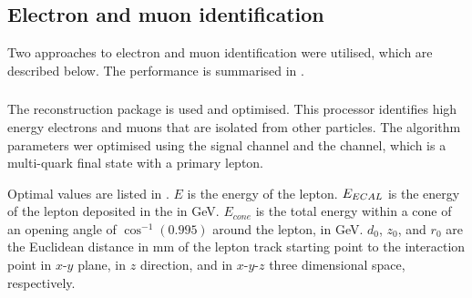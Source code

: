 \subsection{Electron and muon identification}
\label{sec:doubleHiggsLeptonID}

Two approaches to electron and muon identification were utilised, which are described below. The performance is summarised in .



\subsubsection{\IsolatedLeptonFinderProcessor}
\label{sec:doubleHiggsIsolatedLeptonFinder}
The \IsolatedLeptonFinderProcessor reconstruction package is used and optimised. This processor identifies high energy electrons and muons that are isolated from other particles. The algorithm parameters wer optimised using the signal channel and the \eeTo{ \Pquark \Pquark \Pquark \Pquark \Plepton \Pnu} channel, which is a multi-quark final state with a primary lepton.


Optimal values are listed in . $E$ is the energy of the lepton. $E_{ECAL}$ is the energy of the lepton deposited in the \ECAL in GeV. $E_{cone}$ is the total energy within a cone of an opening angle of $\cos^{-1}(0.995)$ around the lepton, in GeV. $d_0$, $z_0$, and $r_0$ are the Euclidean distance in mm of the lepton track starting point to the interaction point in $x$-$y$ plane, in $z$ direction, and in $x$-$y$-$z$ three dimensional space, respectively.

